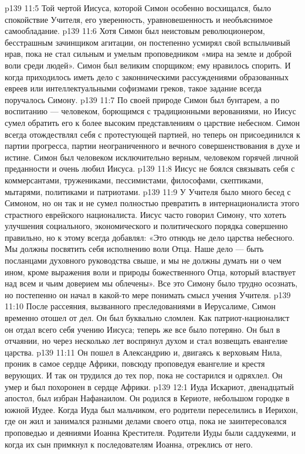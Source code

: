 \vs p139 11:5 \pc Той чертой Иисуса, которой Симон особенно восхищался, было спокойствие Учителя, его уверенность, уравновешенность и необъяснимое самообладание.
\vs p139 11:6 \pc Хотя Симон был неистовым революционером, бесстрашным зачинщиком агитации, он постепенно усмирял свой вспыльчивый нрав, пока не стал сильным и умелым проповедником «мира на земле и доброй воли среди людей». Симон был великим спорщиком; ему нравилось спорить. И когда приходилось иметь дело с законническими рассуждениями образованных евреев или интеллектуальными софизмами греков, такое задание всегда поручалось Симону.
\vs p139 11:7 По своей природе Симон был бунтарем, а по воспитанию --- человеком, борющимся с традиционными верованиями, но Иисус сумел обратить его к более высоким представлениям о царствие небесном. Симон всегда отождествлял себя с протестующей партией, но теперь он присоединился к партии прогресса, партии неограниченного и вечного совершенствования в духе и истине. Симон был человеком исключительно верным, человеком горячей личной преданности и очень любил Иисуса.
\vs p139 11:8 \pc Иисус не боялся связывать себя с коммерсантами, тружениками, пессимистами, философами, скептиками, мытарями, политиками и патриотами.
\vs p139 11:9 \pc У Учителя было много бесед с Симоном, но он так и не сумел полностью превратить в интернационалиста этого страстного еврейского националиста. Иисус часто говорил Симону, что хотеть улучшения социального, экономического и политического порядка совершенно правильно, но к этому всегда добавлял: «Это отнюдь не дело царства небесного. Мы должны посвятить себя исполнению воли Отца. Наше дело --- быть посланцами духовного руководства свыше, и мы не должны думать ни о чем ином, кроме выражения воли и природы божественного Отца, который властвует над всем и чьим доверием мы облечены». Все это Симону было трудно осознать, но постепенно он начал в какой\hyp{}то мере понимать смысл учения Учителя.
\vs p139 11:10 \pc После рассеяния, вызванного преследованиями в Иерусалиме, Симон временно отошел от дел. Он был буквально сломлен. Как патриот\hyp{}националист он отдал всего себя учению Иисуса; теперь же все было потеряно. Он был в отчаянии, но через несколько лет воспрянул духом и стал возвещать евангелие царства.
\vs p139 11:11 Он пошел в Александрию и, двигаясь к верховьям Нила, проник в самое сердце Африки, повсюду проповедуя евангелие и крестя верующих. И так он трудился до тех пор, пока не состарился и одряхлел. Он умер и был похоронен в сердце Африки.
\vs p139 12:1 Иуда Искариот, двенадцатый апостол, был избран Нафанаилом. Он родился в Кериоте, небольшом городке в южной Иудее. Когда Иуда был мальчиком, его родители переселились в Иерихон, где он жил и занимался разными делами своего отца, пока не заинтересовался проповедью и деяниями Иоанна Крестителя. Родители Иуды были саддукеями, и когда их сын примкнул к последователям Иоанна, отреклись от него.
